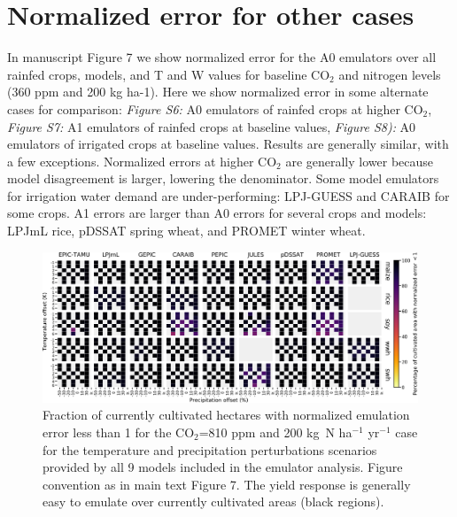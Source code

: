\documentclass[12pt]{article}
\begin{document}
\section{Normalized error for other cases}
\begin{flushleft}
In manuscript Figure 7 we show normalized error for the A0 emulators over all rainfed crops, models, and T and W values for 
	baseline CO$_2$ and nitrogen levels (360 ppm and 200 kg ha-1). Here we show normalized error in some alternate cases for comparison: \textit{Figure S6:} A0 emulators of rainfed crops at higher CO$_2$, \textit{Figure S7:} A1 emulators of rainfed crops at baseline values, \textit{Figure S8):} A0 emulators of irrigated crops at 
baseline values. 
Results are generally similar, with a few exceptions. Normalized errors at higher CO$_2$ are generally lower because model disagreement is larger, lowering the denominator. Some model emulators for irrigation water demand are under-performing: LPJ-GUESS and CARAIB for some crops.
A1 errors are larger than A0 errors for several crops and models: LPJmL rice, pDSSAT spring wheat, and PROMET winter wheat.
\end{flushleft}

\vspace{1in}

\begin{figure}[h!]
  \centering
  \includegraphics[width=15.5cm]{error_grid_810.png}
  \caption{
  Fraction of currently cultivated hectares with normalized emulation error less than 1 for the CO$_2$=810 ppm and 200 kg~N ha$^{-1}$ yr$^{-1}$ case for the temperature and precipitation perturbations scenarios provided by all 9 models included in the emulator analysis. 
  Figure convention as in main text Figure 7.
  The yield response is generally easy to emulate over currently cultivated areas (black regions).
  }
  \label{fig:error810}
\end{figure}
\end{document}
